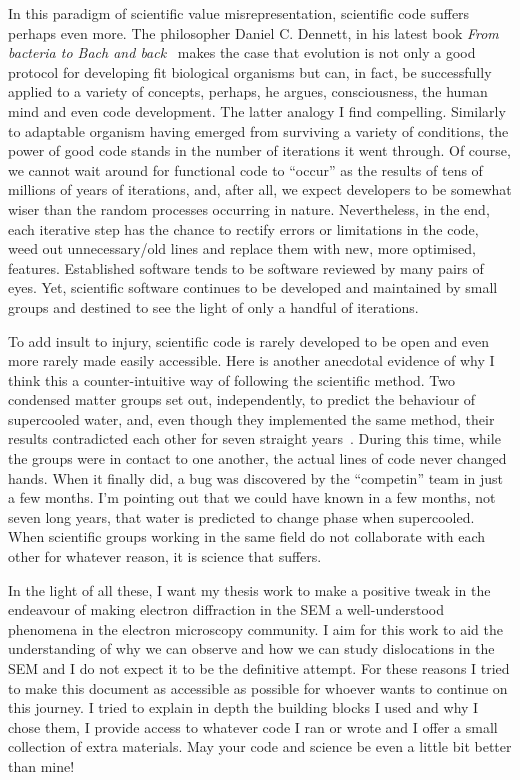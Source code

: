 In this paradigm of scientific value misrepresentation, scientific code suffers perhaps even more. The philosopher Daniel C. Dennett, in his latest book \textit{From bacteria to Bach and back}~\cite{Dennett} makes the case that evolution is not only a good protocol for developing fit biological organisms but can, in fact, be successfully applied to a variety of concepts, perhaps, he argues, consciousness, the human mind and even code development. The latter analogy I find compelling. Similarly to adaptable organism having emerged from surviving a variety of conditions, the power of good code stands in the number of iterations it went through. Of course, we cannot wait around for functional code to ``occur'' as the results of tens of millions of years of iterations, and, after all, we expect developers to be somewhat wiser than the random processes occurring in nature. Nevertheless, in the end, each iterative step has the chance to rectify errors or limitations in the code, weed out unnecessary/old lines and replace them with new, more optimised, features. Established software tends to be software reviewed by many pairs of eyes. Yet, scientific software continues to be developed and  maintained by small groups and destined to see the light of only a handful of iterations.  


To add insult to injury, scientific code is rarely developed to be open and even more rarely made easily accessible. Here is another anecdotal evidence of why I think this a counter-intuitive way of following the scientific method. Two condensed matter groups set out, independently, to predict the behaviour of supercooled water, and, even though they implemented the same method, their results contradicted each other for seven straight years~\cite{supercool}. During this time, while the groups were in contact to one another, the actual lines of code never changed hands. When it finally did, a bug was discovered by the ``competin'' team in just a few months. I'm pointing out that we could have known in a few months, not seven long years, that water is predicted to change phase when supercooled. When scientific groups working in the same field do not collaborate with each other for whatever reason, it is science that suffers.


In the light of all these, I want my thesis work to make a positive tweak in the endeavour of making electron diffraction in the SEM a well-understood phenomena in the electron microscopy community. I aim for this work to aid the understanding of why we can observe and how we can study dislocations in the SEM and I do not expect it to be the definitive attempt. For these reasons I tried to make this document as accessible as possible for whoever wants to continue on this journey. I tried to explain in depth the building blocks I used and why I chose them, I provide access to whatever code I ran or wrote and I offer a small collection of extra materials. May your code and science be even a little bit better than mine!



